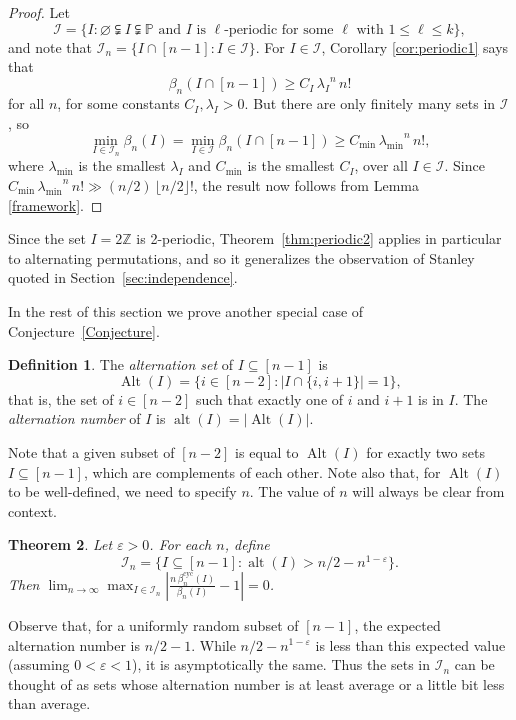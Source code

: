 \documentclass[12pt]{article}
\newcommand{\betacyc}{\beta^{\text{cyc}}}
\newcommand{\PP}{\mathbb{P}}
\DeclareMathOperator{\Alt}{Alt}
\DeclareMathOperator{\alt}{alt}
\newcommand{\ZZ}{\mathbb{Z}}
\newcommand{\card}[1]{{\lvert #1 \rvert}} 	%
\newtheorem{thm}{Theorem}[section]
\theoremstyle{definition}
\newtheorem{defn}[thm]{Definition}
\begin{document}
\begin{proof}
Let $$\mathcal{I}=\{I\colon \varnothing\subsetneqq I \subsetneqq \PP  \text{ and $I$ is $\ell$-periodic for some $\ell$ with $1 \le \ell \le k$}\},$$ and note that $\mathcal{I}_n = \{ I \cap [n-1] \colon I\in \mathcal{I}\}$. For $I \in \mathcal{I}$, Corollary \ref{cor:periodic1} says that
\[ \beta_n(I \cap [n-1]) \ge C_I \,{\lambda_I\!}^n\, n! \]
for all $n$, for some constants $C_I, \lambda_I > 0$. But there are only finitely many sets in $\mathcal{I}$, so
\[ \min_{I \in \mathcal{I}_n} \beta_n(I) = \min_{I\in \mathcal{I}} \beta_n(I \cap [n-1]) \ge C_\text{min} \,{\lambda_\text{min}\!}^n \,n!, \]
where $\lambda_\text{min}$ is the smallest $\lambda_I$ and $C_\text{min}$ is the smallest $C_I$, over all $I\in\mathcal{I}$. Since $C_\text{min} \,{\lambda_\text{min}\!}^n \,n! \gg {(n/2)\, \lfloor n/2 \rfloor!}$, the result now follows from Lemma \ref{framework}.
\end{proof}

Since the set $I=2\ZZ$ is 2-periodic, Theorem~\ref{thm:periodic2} applies in particular to alternating permutations, and so it generalizes the observation of Stanley quoted in Section~\ref{sec:independence}.

In the rest of this section we prove another special case of Conjecture~\ref{Conjecture}.

\begin{defn} \label{alternation} The \emph{alternation set} of $I \subseteq [n-1]$ is 
$$\Alt(I)=\{i\in[n-2]\colon|I\cap\{i,i+1\}|=1\},$$ 
that is, the set of $i \in [n-2]$ such that exactly one of $i$ and $i+1$ is in $I$. The \emph{alternation number} of $I$ is $\alt(I) = \card{\Alt(I)}$.
\end{defn}

Note that a given subset of $[n-2]$ is equal to $\Alt(I)$ for exactly two sets $I \subseteq [n-1]$, which are complements of each other. Note also that, for $\Alt(I)$ to be well-defined, we need to specify $n$. The value of $n$ will always be clear from context.

\begin{thm} \label{TheBigOne}
Let $\varepsilon > 0$. For each $n$, define
\[ \mathcal{I}_n = \{I \subseteq [n-1] \colon \alt(I) > n/2 - n^{1-\varepsilon}\}. \]
Then $\lim_{n\to\infty} \max_{I \in \mathcal{I}_n} \left|\frac{n\,\betacyc_n(I)}{\beta_n(I)} - 1\right| = 0$.
\end{thm}

Observe that, for a uniformly random subset of $[n-1]$, the expected alternation number is $n/2-1$. While $n/2 - n^{1-\varepsilon}$ is less than this expected value (assuming $0 < \varepsilon < 1$), it is asymptotically the same. Thus the sets in $\mathcal{I}_n$ can be thought of as sets whose alternation number is at least average or a little bit less than average.
\end{document}
